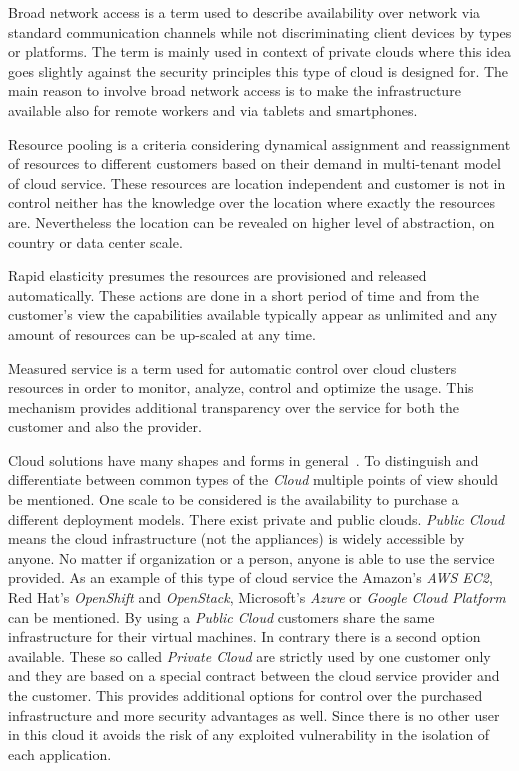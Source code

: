 Broad network access is a term used to describe availability over network via standard communication channels while not discriminating client devices by types or platforms. The term is mainly used in context of private clouds where this idea goes slightly against the security principles this type of cloud is designed for. The main reason to involve broad network access is to make the infrastructure available also for remote workers and via tablets and smartphones.

Resource pooling is a criteria considering dynamical assignment and reassignment of resources to different customers based on their demand in multi-tenant model of cloud service. These resources are location independent and customer is not in control neither has the knowledge over the location where exactly the resources are. Nevertheless the location can be revealed on higher level of abstraction, on country or data center scale.

Rapid elasticity presumes the resources are provisioned and released automatically. These actions are done in a short period of time and from the customer's view the capabilities available typically appear as unlimited and any amount of resources can be up-scaled at any time.

Measured service is a term used for automatic control over cloud clusters resources in order to monitor, analyze, control and optimize the usage. This mechanism provides additional transparency over the service for both the customer and also the provider.

Cloud solutions have many shapes and forms in general~\cite{hassan}. To distinguish and differentiate between common types of the \emph{Cloud} multiple points of view should be mentioned. One scale to be considered is the availability to purchase a different deployment models. There exist private and public clouds. \emph{Public Cloud} means the cloud infrastructure (not the appliances) is widely accessible by anyone. No matter if organization or a person, anyone is able to use the service provided. As an example of this type of cloud service the Amazon's \emph{AWS EC2}, Red Hat's \emph{OpenShift} and \emph{OpenStack}, Microsoft's \emph{Azure} or \emph{Google Cloud Platform} can be mentioned. By using a \emph{Public Cloud} customers share the same infrastructure for their virtual machines. In contrary there is a second option available. These so called \emph{Private Cloud} are strictly used by one customer only and they are based on a special contract between the cloud service provider and the customer. This provides additional options for control over the purchased infrastructure and more security advantages as well. Since there is no other user in this cloud it avoids the risk of any exploited vulnerability in the isolation of each application.

